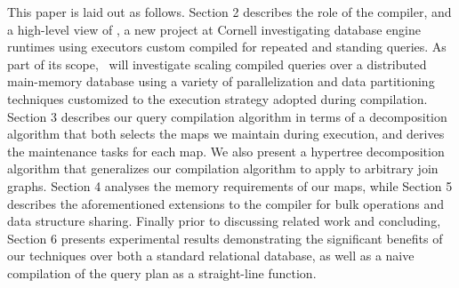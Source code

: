 This paper is laid out as follows. Section 2 describes the role of the compiler,
and a high-level view of \compiler, a new project at Cornell investigating
database engine runtimes using executors custom compiled for repeated and
standing queries. As part of its scope, \compiler\ will investigate scaling
compiled queries over a distributed main-memory database using a variety of
parallelization and data partitioning techniques customized to the execution
strategy adopted during compilation. Section 3 describes our query compilation
algorithm in terms of a decomposition algorithm that both selects the maps we
maintain during execution, and derives the maintenance tasks for each map. We
also present a hypertree decomposition algorithm that generalizes our compilation
algorithm to apply to arbitrary join graphs. Section 4 analyses the memory
requirements of our maps, while Section 5 describes the aforementioned extensions
to the compiler for bulk operations and data structure sharing. Finally prior to
discussing related work and concluding, Section 6 presents experimental results
demonstrating the significant benefits of our techniques over both a standard
relational database, as well as a naive compilation of the query plan as a
straight-line function.


